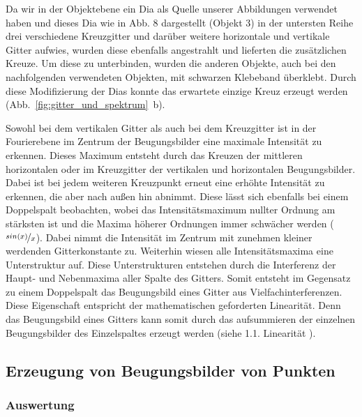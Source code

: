 Da wir in der Objektebene ein Dia als Quelle unserer Abbildungen verwendet haben und dieses Dia wie in Abb. 8 %
 dargestellt (Objekt 3) in der untersten Reihe drei verschiedene Kreuzgitter und darüber weitere horizontale und vertikale Gitter aufwies, wurden diese ebenfalls angestrahlt und lieferten die zusätzlichen Kreuze. Um diese zu unterbinden, wurden die anderen Objekte, auch bei den nachfolgenden verwendeten Objekten, mit schwarzen Klebeband überklebt. Durch diese Modifizierung der Dias konnte das erwartete einzige Kreuz erzeugt werden (Abb.~\ref{fig:gitter_und_spektrum}~b).

Sowohl bei dem vertikalen Gitter als auch bei dem Kreuzgitter ist in der Fourierebene im Zentrum der Beugungsbilder eine maximale Intensität zu erkennen. Dieses Maximum entsteht durch das Kreuzen der mittleren horizontalen oder im Kreuzgitter der vertikalen und
horizontalen Beugungsbilder. Dabei ist bei jedem weiteren Kreuzpunkt erneut eine erhöhte Intensität zu erkennen, die aber nach außen hin abnimmt. Diese lässt sich ebenfalls bei einem
Doppelspalt beobachten, wobei das Intensitätsmaximum nullter Ordnung am stärksten ist und die Maxima höherer Ordnungen immer schwächer werden ($\nicefrac{sin(x)}{x}$). Dabei nimmt die Intensität im Zentrum mit zunehmen kleiner werdenden Gitterkonstante zu.
Weiterhin wiesen alle Intensitätsmaxima eine Unterstruktur auf. Diese Unterstrukturen entstehen durch die Interferenz der Haupt- und Nebenmaxima aller Spalte des Gitters. Somit entsteht im Gegensatz zu einem Doppelspalt das Beugungsbild eines Gitter aus Vielfachinterferenzen. Diese Eigenschaft entspricht der mathematischen geforderten Linearität. Denn das Beugungsbild eines Gitters kann somit durch das aufsummieren der einzelnen Beugungsbilder des Einzelspaltes erzeugt werden (siehe 1.1. Linearität%
).


\subsection{Erzeugung von Beugungsbilder von Punkten}
\subsubsection*{Auswertung}


